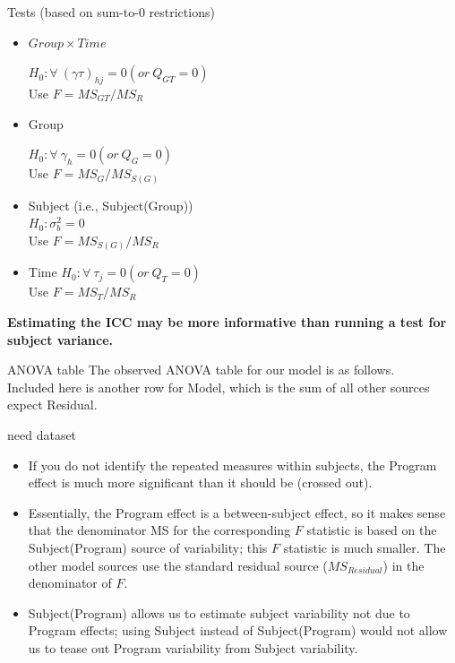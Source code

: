 \documentclass[
  9pt,
  ignorenonframetext,
]{beamer}
\begin{document}
\begin{frame}{Tests (based on sum-to-0 restrictions)}
\protect\hypertarget{tests-based-on-sum-to-0-restrictions}{}
\begin{itemize}
\item
  \(Group \times Time\)

  \(H_0: \forall\ (\gamma \tau )_{hj} = 0 (or\ Q_{GT}=0)\)\\
  Use \(F = MS_{GT}/MS_{R}\)
\item
  Group

  \(H_0: \forall\ \gamma_h = 0 (or\ Q_G=0)\)\\
  Use \(F = MS_G/MS_{S(G)}\)
\item
  Subject (i.e., Subject(Group))\\
  \(H_0: \sigma_b^2 = 0\)\\
  Use \(F = MS_{S(G)}/MS_R\)
\item
  Time \(H_0: \forall\  \tau_j = 0 (or\ Q_T=0)\)\\
  Use \(F = MS_T/MS_R\)
\end{itemize}

\textbf{Estimating the ICC may be more informative than running a test
for subject variance.}
\end{frame}

\begin{frame}{ANOVA table}
\protect\hypertarget{anova-table}{}
The observed ANOVA table for our model is as follows.\\
Included here is another row for Model, which is the sum of all other
sources expect Residual.

\alert {need dataset}
\end{frame}

\begin{frame}{}
\protect\hypertarget{section-2}{}
\begin{itemize}
\item
  If you do not identify the repeated measures within subjects, the
  Program effect is much more significant than it should be (crossed
  out).
\item
  Essentially, the Program effect is a between-subject effect, so it
  makes sense that the denominator MS for the corresponding \(F\)
  statistic is based on the Subject(Program) source of variability; this
  \(F\) statistic is much smaller. The other model sources use the
  standard residual source (\(MS_{Residual}\)) in the denominator of
  \(F\).
\item
  Subject(Program) allows us to estimate subject variability not due to
  Program effects; using Subject instead of Subject(Program) would not
  allow us to tease out Program variability from Subject variability.
\end{itemize}
\end{frame}
\end{document}
